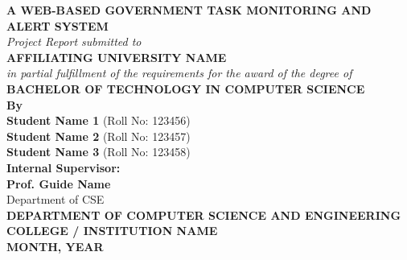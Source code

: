 \begin{titlepage}
\begin{center}
    \vspace*{0.5cm}
    
    {\Huge \textbf{A WEB-BASED GOVERNMENT TASK MONITORING AND ALERT SYSTEM}}\\[1.5cm]
    
    {\large \textit{Project Report submitted to}}\\[0.5cm]
    {\Large \textbf{AFFILIATING UNIVERSITY NAME}}\\[0.8cm]
    
    {\large \textit{in partial fulfillment of the requirements for the award of the degree of}}\\[0.5cm]
    {\Large \textbf{BACHELOR OF TECHNOLOGY IN COMPUTER SCIENCE}}\\[1.5cm]
    
    \textbf{By}\\[0.3cm]
    \textbf{Student Name 1} (Roll No: 123456)\\
    \textbf{Student Name 2} (Roll No: 123457)\\
    \textbf{Student Name 3} (Roll No: 123458)\\[1.5cm]
    
    \textbf{Internal Supervisor:}\\[0.2cm]
    \textbf{Prof. Guide Name}\\
    Department of CSE\\[1.5cm]
    
    {\large \textbf{DEPARTMENT OF COMPUTER SCIENCE AND ENGINEERING}}\\[0.2cm]
    {\large \textbf{COLLEGE / INSTITUTION NAME}}\\[0.2cm]
    {\textbf{MONTH, YEAR}}
    
\end{center}
\end{titlepage}
\clearpage
